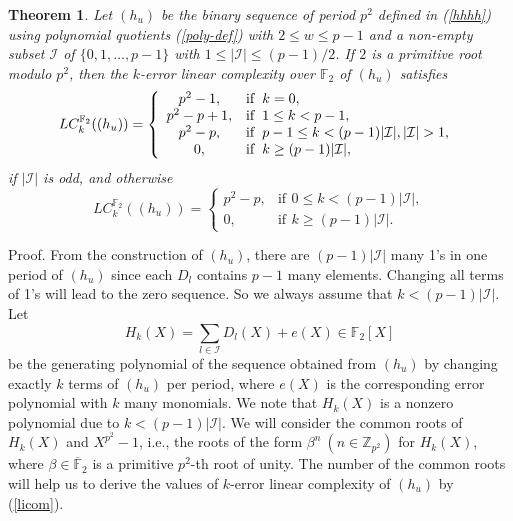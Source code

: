 \documentclass [11pt,a4paper]{article}
\def\F{\mathbb{F}}
\def\Z{\mathbb{Z}}
\newtheorem{theorem}{Theorem}
\begin{document}
\begin{theorem}\label{klc-2-primitive}
Let $(h_u)$ be the binary sequence of period $p^{2}$ defined in (\ref{hhhh}) using polynomial quotients (\ref{poly-def}) with $2\le w\le p-1$ and a non-empty subset $\mathcal{I}$ of $\{0,1,\ldots,p-1\}$ with $1\le |\mathcal{I}|\le (p-1)/2$. If $2$ is a primitive root modulo $p^2$, then
the $k$-error linear complexity  over $\F_2$ of $(h_u)$  satisfies
\[
 LC^{\F_2}_k((h_u))=\left\{
\begin{array}{cl}
p^2-1, & \mathrm{if}\,\ k=0, \\
p^2-p+1, & \mathrm{if}\,\ 1\le k<p-1, \\
p^2-p, & \mathrm{if}\,\ p-1\le k< (p-1)|\mathcal{I}|, |\mathcal{I}|>1, \\
0, & \mathrm{if}\,\ k\ge (p-1)|\mathcal{I}|, \\
\end{array}
\right.\\
\]
if $|\mathcal{I}|$ is odd, and otherwise
\[
 LC^{\F_2}_k((h_u))=\left\{
\begin{array}{cl}
p^2-p, & \mathrm{if}\,\ 0\le k<(p-1)|\mathcal{I}|, \\
0, & \mathrm{if}\,\ k\ge (p-1)|\mathcal{I}|.
\end{array}
\right.
\]
\end{theorem}
Proof. From the construction of $(h_u)$, there are $(p-1)|\mathcal{I}|$ many 1's in one period of $(h_u)$ since each $D_l$ contains $p-1$ many elements. Changing
all terms of 1's will lead to the zero sequence. So we always assume that $k<(p-1)|\mathcal{I}|$. Let
\begin{equation}\label{Hk}
H_k(X)=\sum\limits_{l\in \mathcal{I}}D_{l}(X)+e(X)\in \F_2[X]
\end{equation}
be the generating polynomial of the sequence obtained from $(h_u)$ by changing exactly $k$ terms of $(h_u)$ per period,
where $e(X)$ is the corresponding error polynomial with $k$ many  monomials. We note that $H_k(X)$ is a nonzero polynomial due to $k<(p-1)|\mathcal{I}|$. We will consider the common roots of $H_k(X)$ and $X^{p^2}-1$,
i.e.,  the roots of the form $\beta^{n}  ~ (n\in \Z_{p^2})$ for $H_k(X)$, where $\beta \in \overline{\mathbb{F}}_{2}$ is a  primitive $p^2$-th root of unity. The number of the common roots will help us to derive the values of $k$-error linear
complexity of $(h_u)$  by  (\ref{licom}).
\end{document}
